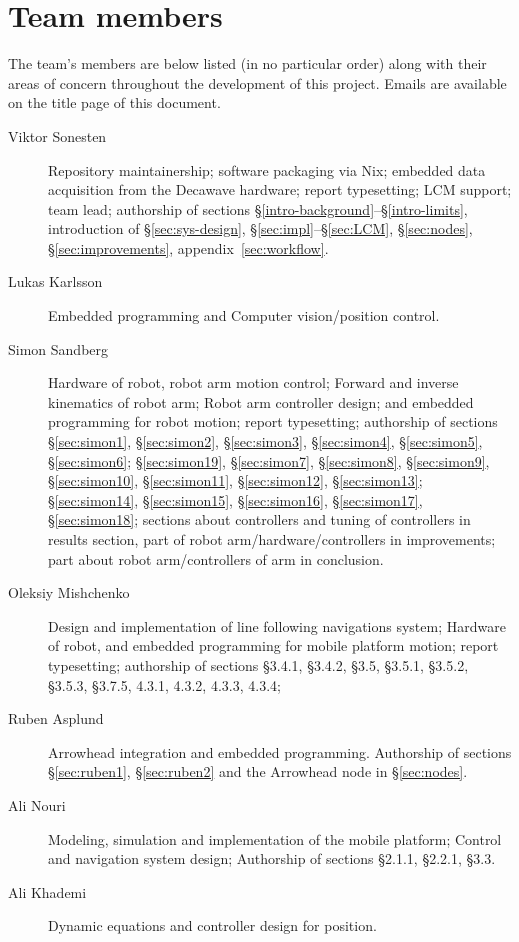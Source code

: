 \section{Team members}
The team's members are below listed (in no particular order) along with their areas of concern throughout the development of this project.
Emails are available on the title page of this document.

\begin{description}
\item[Viktor Sonesten] Repository maintainership; software packaging via
  Nix; embedded data acquisition from the Decawave hardware; report
  typesetting; LCM support; team lead; authorship of sections
  §\ref{intro-background}--§\ref{intro-limits}, introduction of
  §\ref{sec:sys-design}, §\ref{sec:impl}--§\ref{sec:LCM},
  §\ref{sec:nodes}, §\ref{sec:improvements},
  appendix~\ref{sec:workflow}.

    \item[Lukas Karlsson]
    Embedded programming and
    Computer vision/position control.

    \item[Simon Sandberg]
    Hardware of robot, robot arm motion control;
    Forward and inverse kinematics of robot arm;
    Robot arm controller design;
    and embedded programming for robot motion; report
    typesetting; authorship of sections §\ref{sec:simon1}, §\ref{sec:simon2}, §\ref{sec:simon3}, §\ref{sec:simon4}, §\ref{sec:simon5}, §\ref{sec:simon6};
    §\ref{sec:simon19}, §\ref{sec:simon7}, §\ref{sec:simon8}, §\ref{sec:simon9}, §\ref{sec:simon10}, §\ref{sec:simon11}, §\ref{sec:simon12}, §\ref{sec:simon13};
    §\ref{sec:simon14}, §\ref{sec:simon15}, §\ref{sec:simon16}, §\ref{sec:simon17}, §\ref{sec:simon18};
    sections about controllers and tuning of controllers in results section, part of robot arm/hardware/controllers in improvements;
    part about robot arm/controllers of arm in conclusion.

    \item[Oleksiy Mishchenko]
    Design and implementation of line following navigations system;
    Hardware of robot, and embedded programming for mobile platform motion; report
    typesetting; authorship of sections §3.4.1, §3.4.2, §3.5, §3.5.1, §3.5.2, §3.5.3, §3.7.5, 4.3.1, 4.3.2, 4.3.3, 4.3.4;
   

    \item[Ruben Asplund]
    Arrowhead integration and embedded programming.
    Authorship of sections §\ref{sec:ruben1}, §\ref{sec:ruben2} and the Arrowhead node in §\ref{sec:nodes}.

    \item[Ali Nouri]
    Modeling, simulation and implementation of the mobile platform;
    Control and navigation system design;
    Authorship of sections §2.1.1, §2.2.1, §3.3.

    \item[Ali Khademi]
    Dynamic equations and controller design for position.
\end{description}
